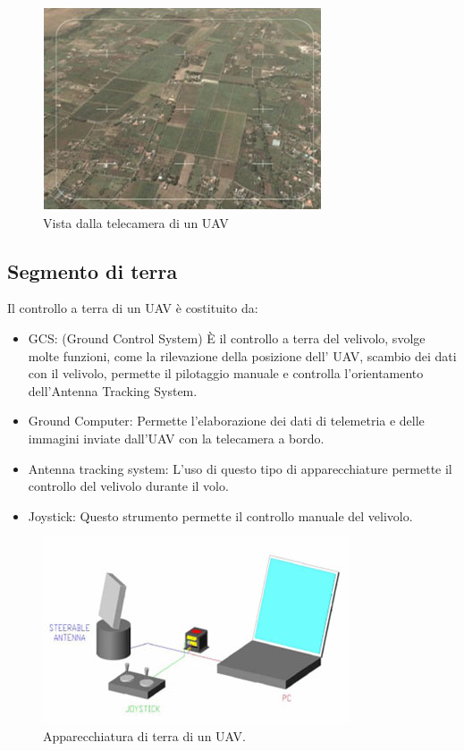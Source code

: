 \begin{figure}
  \centering
  \includegraphics[height=0.25\textheight]{Immagini/segterra3}
  \caption{Vista dalla telecamera di un \ac{UAV}}
  \label{img:vista}
\end{figure}

\subsection*{Segmento di terra}
Il controllo a terra di un \ac{UAV} è costituito da:
\begin{itemize}
 \item GCS: (Ground Control System) È il controllo a terra del velivolo, svolge molte funzioni, come la rilevazione della posizione dell'
 \ac{UAV}, scambio dei dati con il velivolo, permette il pilotaggio manuale e controlla l'orientamento dell'Antenna Tracking System.
 \item Ground Computer: Permette l'elaborazione dei dati di telemetria e delle immagini inviate dall'\ac{UAV} con la telecamera a bordo.
 \item Antenna tracking system: L'uso di questo tipo di apparecchiature permette il controllo del velivolo durante il volo.
 \item Joystick: Questo strumento permette il controllo manuale del velivolo.
\end{itemize}

\begin{figure}[!h]
  \includegraphics[height=0.25\textheight]{Immagini/segterra1}
  \caption{Apparecchiatura di terra di un \ac{UAV}.}
  \label{img:terra}
\end{figure}

